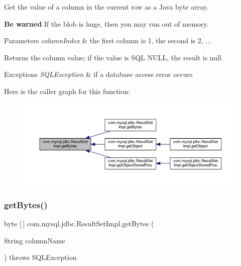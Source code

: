 Get the value of a column in the current row as a Java byte array.

{\bfseries Be warned} If the blob is huge, then you may run out of memory. 


\begin{DoxyParams}{Parameters}
{\em column\+Index} & the first column is 1, the second is 2, ...\\
\hline
\end{DoxyParams}
\begin{DoxyReturn}{Returns}
the column value; if the value is S\+QL N\+U\+LL, the result is null
\end{DoxyReturn}

\begin{DoxyExceptions}{Exceptions}
{\em S\+Q\+L\+Exception} & if a database access error occurs \\
\hline
\end{DoxyExceptions}
Here is the caller graph for this function\+:
\nopagebreak
\begin{figure}[H]
\begin{center}
\leavevmode
\includegraphics[width=350pt]{classcom_1_1mysql_1_1jdbc_1_1_result_set_impl_a128a017a783b29ee921fe5ad959136fe_icgraph}
\end{center}
\end{figure}
\mbox{\label{classcom_1_1mysql_1_1jdbc_1_1_result_set_impl_a0c4ba0624ab9ded2a2decf15d66e855d}} 
\subsubsection{\texorpdfstring{get\+Bytes()}{getBytes()}\hspace{0.1cm}{\footnotesize\ttfamily [2/2]}}
{\footnotesize\ttfamily byte \mbox{[}$\,$\mbox{]} com.\+mysql.\+jdbc.\+Result\+Set\+Impl.\+get\+Bytes (\begin{DoxyParamCaption}\item[{String}]{column\+Name }\end{DoxyParamCaption}) throws S\+Q\+L\+Exception}


